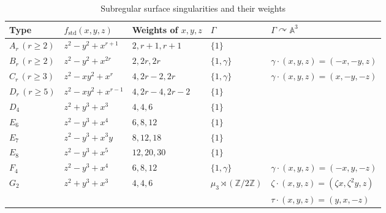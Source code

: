 \documentclass{article} %
\numberwithin{equation}{section}
\theoremstyle{definition}
\newcommand{\A}{\mathbb{A}}
\newcommand{\Z}{\mathbb{Z}}
\newcommand{\rl}{r} %
\begin{document}
\renewcommand{\arraystretch}{1.5} %
\begin{table}
\centering
\begin{tabular}{|l | l | l | l| l| }
	\hline
    Type & $f_{\mathrm{std}}(x,y,z)$ & Weights of $x,y,z$ &$\Gamma$ & $\Gamma\curvearrowright \A^3$  \\
	\hline       
	$A_{\rl}\, (\rl\geq 2)$ & $z^2-y^2+ x^{\rl+1}$ & $2,\rl+1,\rl+1$ & $\{1\}$ &   \\
    \hline 
    $B_{\rl}\, (\rl\geq 2)$ & $z^2- y^2 + x^{2\rl}$ & $2,2\rl,2\rl$ &$\{1,\gamma\}$ & $\gamma\cdot (x,y,z) = (-x,-y,z)$ \\
    \hline
    $C_{\rl}\, (\rl\geq 3)$ & $z^2 - xy^2 + x^{\rl}$ & $4,2\rl-2,2\rl$ &$\{1,\gamma\}$ & $\gamma\cdot (x,y,z) = (x,-y,-z)$  \\
    \hline
	$D_{\rl}\, (\rl\geq 5)$ & $z^2  -xy^2 + x^{\rl-1}$  & $4,2\rl-4,2\rl-2$& $\{1\}$ &    \\
    \hline
    $D_{4}$ & $z^2  +y^3 + x^{3}$  & $4,4,6$& $\{1\}$ &    \\
    \hline
	$E_6$ & $z^2 - y^3 + x^4$ & $6,8,12$ & $\{1\}$ &   \\
    \hline
	$E_7$ & $z^2 - y^3 + x^3y $ & $8,12,18$ & $\{1\}$ &  \\
    \hline
	$E_8$ & $z^2 - y^3 + x^5 $ & $12,20,30$& $\{1\}$ &  \\
    \hline
    $F_4$ & $z^2 - y^3 + x^4$ & $6,8,12$ &$\{1,\gamma\}$ & $\gamma\cdot (x,y,z) = (-x,y,-z)$\\
    \hline
    $G_2$ & $z^2 + y^3 + x^3$& $4,4,6$ &$\mu_3\rtimes (\Z/2\Z)$ & $\zeta\cdot (x,y,z) = (\zeta x,\zeta^2 y,z)$\\
     & &  && $\tau\cdot (x,y,z) = (y,x,-z)$\\
	\hline
\end{tabular}
\caption{Subregular surface singularities and their weights}
\label{table: surface singularities}
\end{table}
\endgroup
\end{document}
